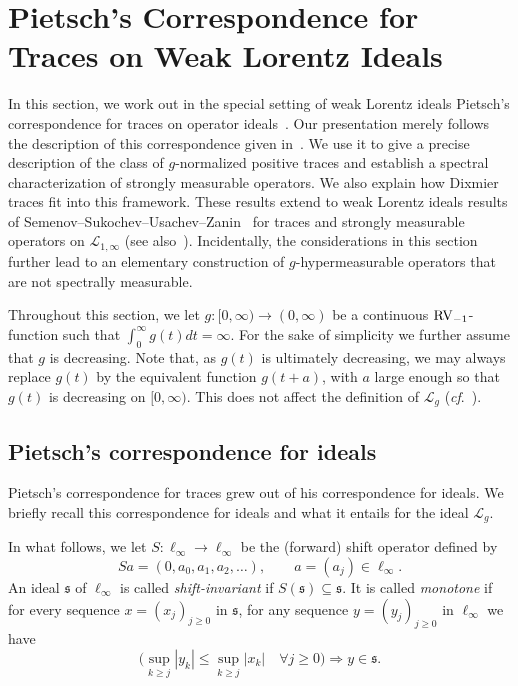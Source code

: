 \documentclass[10pt, a4paper]{amsart}
\newcommand{\sL}{\mathscr{L}}
\newcommand{\fs}{\mathfrak{s}}
\numberwithin{equation}{section}
\theoremstyle{definition}
\theoremstyle{remark}
\newcommand{\RV}{\textup{RV}}
\begin{document}
 \section{Pietsch's Correspondence for Traces on Weak Lorentz Ideals}\label{sec:Pietsch}

In this section, we work out in the special setting of weak Lorentz ideals Pietsch's correspondence for traces on operator ideals~\cite{Pi:IEOT17, Pi:AM20}. Our presentation merely follows the description of this correspondence given in~\cite{LSZ:Book}. We use it to give a precise description of the class of $g$-normalized positive traces and establish a spectral characterization of strongly measurable operators. We also explain how Dixmier traces fit into this framework. These results extend to weak Lorentz ideals results of Semenov--Sukochev--Usachev--Zanin~\cite{SSUZ:AIM15} for traces and strongly measurable operators on $\sL_{1,\infty}$ (see also~\cite{LSZ:Book}). Incidentally, the considerations in this section further lead to an elementary construction of $g$-hypermeasurable operators that are not spectrally measurable.

Throughout this section, we let $g:[0,\infty)\rightarrow (0,\infty)$ be a continuous $\RV_{-1}$-function such that $\int_0^\infty g(t)dt=\infty$. For the sake of simplicity we further assume that $g$ is decreasing. Note that, as $g(t)$ is ultimately decreasing, we may always replace $g(t)$ by the equivalent function $g(t+a)$, with $a$ large enough so that $g(t)$ is decreasing on $[0,\infty)$. This does not affect the definition of $\sL_g$ (\emph{cf}.~\cite[Remark~2.19]{PT:Part1}).

\subsection{Pietsch's correspondence for ideals}
Pietsch's correspondence for traces grew out of his correspondence for ideals. We briefly recall this correspondence for ideals and what it entails for the ideal $\sL_g$.

In what follows, we let  $S:\ell_\infty \rightarrow\ell_\infty$ be the (forward) shift operator defined by
\begin{equation}\label{def:forward}
 Sa=(0,a_0, a_1,a_2, \ldots ), \qquad a=(a_j)\in \ell_\infty.
\end{equation}
An ideal $\fs$ of $\ell_\infty$ is called \emph{shift-invariant} if $S(\fs)\subseteq \fs$. It is called \emph{monotone} if for every sequence
$x=(x_j)_{j\geq 0}$ in $\fs$, for any sequence $y=(y_j)_{j\geq 0}$ in $\ell_\infty$ we have
\begin{equation*}
\bigg( \sup_{k \geq j}|y_k| \leq  \sup_{k \geq j}|x_k| \quad \forall j\geq 0 \bigg) \Longrightarrow y\in\fs.
\end{equation*}
\end{document}
